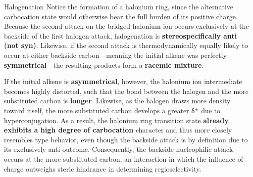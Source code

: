\documentclass[10pt]{article}
\begin{document}
\begin{core}[label=core:halogenation]{Halogenation}
        Notice the formation of a halonium ring, since the alternative carbocation state would otherwise bear the full burden of its positive charge. Because the second attack on the bridged halonium ion occurs exclusively at the backside of the first halogen attack, halogenation is \textbf{stereospecifically anti (not syn)}. Likewise, if the second attack is thermodynamically equally likely to occur at either backside carbon---meaning the initial alkene was perfectly \textbf{symmetrical}---the resulting products form a \textbf{racemic mixture}.

        If the initial alkene is \textbf{asymmetrical}, however, the halonium ion intermediate becomes highly distorted, such that the bond between the halogen and the more substituted carbon is \textbf{longer}. Likewise, as the halogen draws more  density toward itself, the more substituted carbon develops a greater δ$^+$ due to hyperconjugation. As a result, the halonium ring transition state \textbf{already exhibits a high degree of carbocation} character and thus more closely resembles \sno type behavior, even though the backside attack is \snt by definition due to its exclusively anti outcome. Consequently, the backside nucleophilic attack occurs at the more substituted carbon, an interaction in which the influence of charge outweighs steric hindrance in determining regioselectivity.

        \vspace{-0.4cm}


\end{core}
\end{document}
